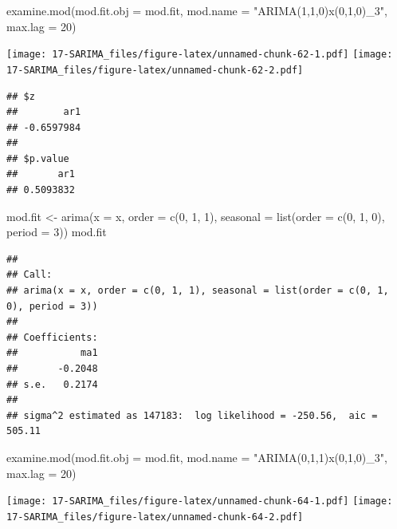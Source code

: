 \documentclass[
]{book}
\newenvironment{Shaded}{\begin{snugshade}}{\end{snugshade}}
\newcommand{\AttributeTok}[1]{\textcolor[rgb]{0.77,0.63,0.00}{#1}}
\newcommand{\DecValTok}[1]{\textcolor[rgb]{0.00,0.00,0.81}{#1}}
\newcommand{\FunctionTok}[1]{\textcolor[rgb]{0.00,0.00,0.00}{#1}}
\newcommand{\NormalTok}[1]{#1}
\newcommand{\OtherTok}[1]{\textcolor[rgb]{0.56,0.35,0.01}{#1}}
\newcommand{\StringTok}[1]{\textcolor[rgb]{0.31,0.60,0.02}{#1}}
\theoremstyle{definition}
\theoremstyle{definition}
\theoremstyle{definition}
\theoremstyle{definition}
\theoremstyle{remark}
\begin{document}
\begin{Shaded}
\begin{Highlighting}[]
  \FunctionTok{examine.mod}\NormalTok{(}\AttributeTok{mod.fit.obj =}\NormalTok{ mod.fit, }\AttributeTok{mod.name =} \StringTok{"ARIMA(1,1,0)x(0,1,0)\_3"}\NormalTok{, }\AttributeTok{max.lag =} \DecValTok{20}\NormalTok{)}
\end{Highlighting}
\end{Shaded}

\texttt{[image: 17-SARIMA\_files/figure-latex/unnamed-chunk-62-1.pdf]} \texttt{[image: 17-SARIMA\_files/figure-latex/unnamed-chunk-62-2.pdf]}

\begin{verbatim}
## $z
##        ar1 
## -0.6597984 
## 
## $p.value
##       ar1 
## 0.5093832
\end{verbatim}

\begin{Shaded}
\begin{Highlighting}[]
\NormalTok{mod.fit }\OtherTok{\textless{}{-}} \FunctionTok{arima}\NormalTok{(}\AttributeTok{x =}\NormalTok{ x, }\AttributeTok{order =} \FunctionTok{c}\NormalTok{(}\DecValTok{0}\NormalTok{, }\DecValTok{1}\NormalTok{, }\DecValTok{1}\NormalTok{), }\AttributeTok{seasonal =} \FunctionTok{list}\NormalTok{(}\AttributeTok{order =} \FunctionTok{c}\NormalTok{(}\DecValTok{0}\NormalTok{, }\DecValTok{1}\NormalTok{, }\DecValTok{0}\NormalTok{), }\AttributeTok{period =} \DecValTok{3}\NormalTok{))}
\NormalTok{  mod.fit}
\end{Highlighting}
\end{Shaded}

\begin{verbatim}
## 
## Call:
## arima(x = x, order = c(0, 1, 1), seasonal = list(order = c(0, 1, 0), period = 3))
## 
## Coefficients:
##           ma1
##       -0.2048
## s.e.   0.2174
## 
## sigma^2 estimated as 147183:  log likelihood = -250.56,  aic = 505.11
\end{verbatim}

\begin{Shaded}
\begin{Highlighting}[]
 \FunctionTok{examine.mod}\NormalTok{(}\AttributeTok{mod.fit.obj =}\NormalTok{ mod.fit, }\AttributeTok{mod.name =} \StringTok{"ARIMA(0,1,1)x(0,1,0)\_3"}\NormalTok{, }\AttributeTok{max.lag =} \DecValTok{20}\NormalTok{)}
\end{Highlighting}
\end{Shaded}

\texttt{[image: 17-SARIMA\_files/figure-latex/unnamed-chunk-64-1.pdf]} \texttt{[image: 17-SARIMA\_files/figure-latex/unnamed-chunk-64-2.pdf]}
\end{document}

